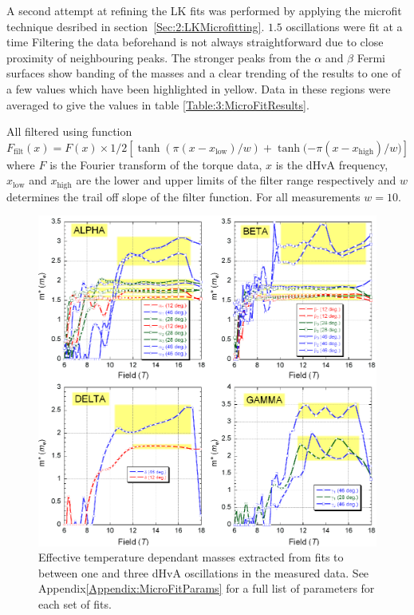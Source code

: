 A second attempt at refining the LK fits was performed by applying the microfit technique desribed in section~\ref{Sec:2:LKMicrofitting}. $1.5$ oscillations were fit at a time Filtering the data beforehand is not always straightforward due to close proximity of neighbouring peaks. The stronger peaks from the $\alpha$ and $\beta$ Fermi surfaces show banding of the masses and a clear trending of the results to one of a few values which have been highlighted in yellow. Data in these regions were averaged to give the values in table \ref{Table:3:MicroFitResults}.

All filtered using function $\textit{F}_{\textrm{filt}}(x) = \textit{F}(x) \times 1/2 [\tanh{(\pi(x - x_{\textrm{low}})/w)} + \tanh{(-\pi(x - x_{\textrm{high}})/w})]$ where $\textit{F}$ is the Fourier transform of the torque data, $x$ is the dHvA frequency, $x_{\textrm{low}}$ and $x_{\textrm{high}}$ are the lower and upper limits of the filter range respectively and $w$ determines the trail off slope of the filter function. For all measurements $w=10$.
\begin{figure}[htbp]
    \begin{center}
        \includegraphics[scale=0.7]{Chapter3-dHvABaFe2P2/Figures/Mass/MicroFits/MicroFits}
        \caption{Effective temperature dependant masses extracted from fits to between one and three dHvA oscillations in the measured data. See Appendix\ref{Appendix:MicroFitParams} for a full list of parameters for each set of fits.}
        \label{Fig:3:MicroFits}
    \end{center}
\end{figure}
